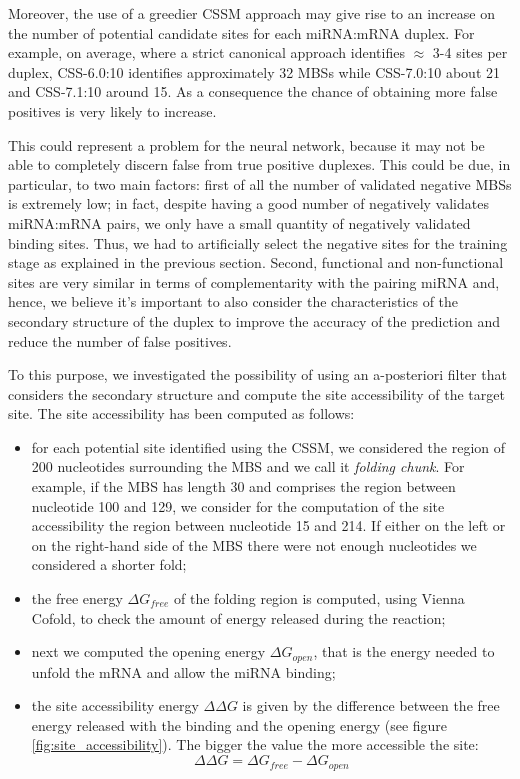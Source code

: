 Moreover, the use of a greedier CSSM approach may give rise to an increase on the number of potential candidate sites for each miRNA:mRNA duplex. For example, on average, where a strict canonical approach identifies $\approx$ 3-4 sites per duplex, CSS-6.0:10 identifies approximately 32 MBSs while CSS-7.0:10 about 21 and CSS-7.1:10 around 15. As a consequence the chance of obtaining more false positives is very likely to increase.  

This could represent a problem for the neural network, because it may not be able to completely discern false from true positive duplexes. This could be due, in particular, to two main factors: first of all the number of validated negative MBSs is extremely low; in fact, despite having  a good number of negatively validates miRNA:mRNA pairs, we only have a small quantity of negatively validated binding sites. Thus, we had to artificially select the negative sites for the training stage as explained in the previous section. Second, functional and non-functional sites are very similar in terms of complementarity with the pairing miRNA and, hence, we believe it's important to also consider the characteristics of the secondary structure of the duplex to improve the accuracy of the prediction and reduce the number of false positives. 

To this purpose, we investigated the possibility of using an a-posteriori filter that considers the secondary structure and compute the site accessibility of the target site. The site accessibility has been computed as follows:
\begin{itemize}
	\item for each potential site identified using the CSSM, we considered the region of 200 nucleotides surrounding the MBS and we call it \emph{folding chunk}. For example, if the MBS has length 30 and comprises the region between nucleotide 100 and 129, we consider for the computation of the site accessibility the region between nucleotide 15 and 214. If either on the left or on the right-hand side of the MBS there were not enough nucleotides we considered a shorter fold;
	\item the free energy $\Delta G_{free}$ of the folding region is computed, using Vienna Cofold, to check the amount of energy released during the reaction;
	\item next we computed the opening energy $\Delta G_{open}$, that is the energy needed to unfold the mRNA and allow the miRNA binding;
	\item the site accessibility energy $\Delta\Delta G$ is given by the difference between the free energy released with the binding and the opening energy (see figure \ref{fig:site_accessibility}). The bigger the value the more accessible the site:
	\begin{equation} \label{eq:sa}
		\Delta\Delta G = \Delta G_{free} - \Delta G_{open}
	\end{equation}
	 
\end{itemize}    

